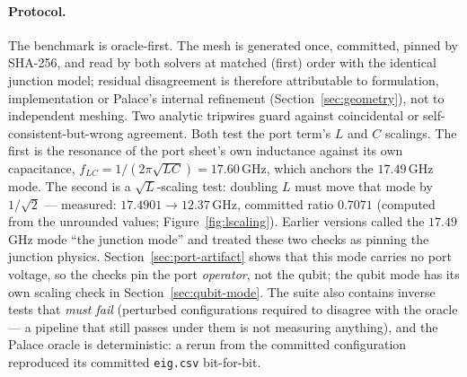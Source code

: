 \documentclass{anvil-paper}
\begin{document}
\paragraph{Protocol.}
The benchmark is oracle-first. The mesh is generated once, committed,
pinned by SHA-256, and read by both solvers at matched (first) order
with the identical junction model; residual disagreement is therefore
attributable to formulation, implementation or Palace's internal
refinement (Section~\ref{sec:geometry}), not to independent meshing.
Two analytic tripwires guard against coincidental or
self-consistent-but-wrong agreement. Both test the port term's $L$ and
$C$ scalings. The first is the resonance of the port sheet's own
inductance against its own capacitance,
$f_{LC} = 1/(2\pi\sqrt{LC}) = 17.60$\,GHz, which anchors the
$17.49$\,GHz mode. The second is a $\sqrt{L}$-scaling test: doubling $L$
must move that mode by $1/\sqrt{2}$ --- measured: $17.4901 \to
12.37$\,GHz, committed ratio $0.7071$ (computed from the unrounded
values; Figure~\ref{fig:lscaling}). Earlier versions called the
$17.49$\,GHz mode ``the junction mode'' and treated these two checks as
pinning the junction physics. Section~\ref{sec:port-artifact} shows that
this mode carries no port voltage, so the checks pin the port
\emph{operator}, not the qubit; the qubit mode has its own scaling check
in Section~\ref{sec:qubit-mode}. The suite also contains inverse tests
that \emph{must fail} (perturbed configurations required to disagree with
the oracle --- a pipeline that still passes under them is not measuring
anything), and the Palace oracle is deterministic: a rerun from the
committed configuration reproduced its committed \texttt{eig.csv}
bit-for-bit.
\end{document}

